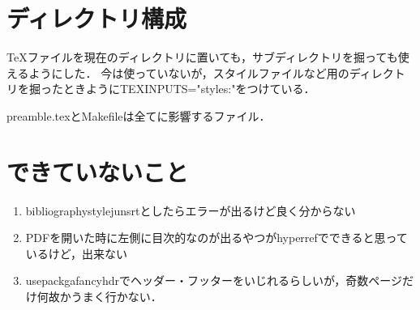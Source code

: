 \documentclass[a4paper,xelatex,ja=standard,twocolumn]{bxjsarticle}
\begin{document}
\section{ディレクトリ構成}
{\TeX}ファイルを現在のディレクトリに置いても，サブディレクトリを掘っても使えるようにした．
今は使っていないが，スタイルファイルなど用のディレクトリを掘ったときようにTEXINPUTS="styles:"をつけている．

preamble.texとMakefileは全てに影響するファイル．

\section{できていないこと}
\begin{enumerate}
  \item bibliographystyle{junsrt}としたらエラーが出るけど良く分からない
  \item PDFを開いた時に左側に目次的なのが出るやつがhyperrefでできると思っているけど，出来ない
  \item usepackga{fancyhdr}でヘッダー・フッターをいじれるらしいが，奇数ページだけ何故かうまく行かない．
\end{enumerate}
\end{document}
